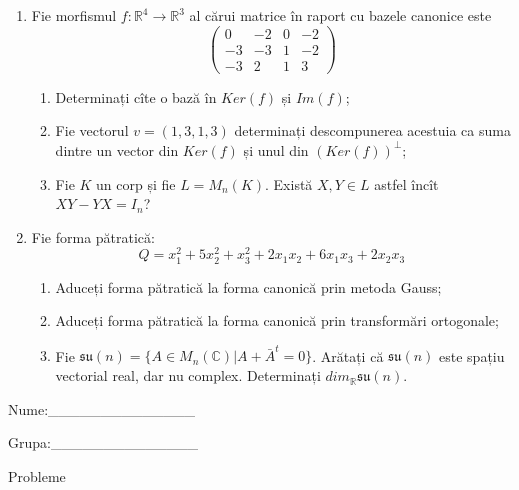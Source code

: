 \documentclass{article}
\begin{document}
\begin{enumerate}
 \item Fie morfismul $f:\mathbb{R}^4 \to \mathbb{R}^3$ al cărui matrice în raport cu bazele canonice este
$$\begin{pmatrix}
0&-2&0&-2\\
-3&-3&1&-2\\
-3&2&1&3
\end{pmatrix}$$

\begin{enumerate}
\item Determinați cîte o bază în $Ker(f)$ și $Im(f)$;
\item Fie vectorul $v=(1,3,1,3)$ determinați descompunerea acestuia ca suma dintre un vector din $Ker(f)$ și unul din $(Ker(f))^\perp$;
\item Fie $K$ un corp și fie $L=M_n(K)$. Există $X,Y \in L$ astfel încît $XY-YX=I_n$?  
\end{enumerate}
\item Fie forma pătratică:
$$Q= x_1^2+5x_2^2+x_3^2+2x_1x_2+6x_1x_3+2x_2x_3$$

\begin{enumerate}
\item Aduceți forma pătratică la forma canonică prin metoda Gauss;
\item Aduceți forma pătratică la forma canonică prin transformări ortogonale;
\item Fie $\mathfrak{su}(n)=\{ A \in M_n(\mathbb{C}) | A+\bar{A}^t=0\}$. Arătați că $\mathfrak{su}(n)$ este spațiu vectorial real, dar nu complex.
Determinați $dim_{\mathbb{R}}\mathfrak{su}(n)$.
\end{enumerate}
\end{enumerate}
\newpage
\begin{flushright}
Nume:\_\_\_\_\_\_\_\_\_\_\_\_\_\_
 
 
Grupa:\_\_\_\_\_\_\_\_\_\_\_\_\_\_
\end{flushright}
\begin{center}
\vspace{2cm}
{\Large Probleme}
\vspace{2cm}
\end{center}
\end{document}
